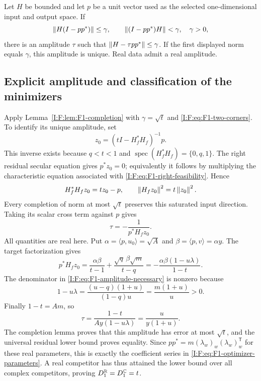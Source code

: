 \begin{lemma}
\label{I:F:lem:F1-completion}
Let $H$ be bounded and let $p$ be a unit vector used as the selected
one-dimensional input and output space. If
\[
 \left\lVert H(I-pp^*)\right\rVert\le\gamma,
 \qquad\left\lVert(I-pp^*)H\right\rVert<\gamma,
 \quad\gamma>0,
\]
there is an amplitude $\tau$ such that
$\left\lVert H-\tau pp^*\right\rVert\le\gamma$. If the first displayed norm equals
$\gamma$, this amplitude is unique. Real data admit a real amplitude.
\end{lemma}



\subsection{Explicit amplitude and classification of the minimizers}

Apply Lemma~\ref{I:F:lem:F1-completion} with $\gamma=\sqrt t$ and
\eqref{I:F:eq:F1-two-corners}. To identify its unique amplitude, set
\[
 z_0=(tI-H_f^*H_f)^{-1}p.
\]
This inverse exists because $q<t<1$ and
$\operatorname{spec}(H_f^*H_f)=\{0,q,1\}$. The right residual secular
equation gives $p^*z_0=0$; equivalently it follows by multiplying the
characteristic equation associated with
\eqref{I:F:eq:F1-right-feasibility}. Hence
\[
 H_f^*H_fz_0=t z_0-p,
 \qquad\left\lVert H_fz_0\right\rVert^2=t\left\lVert z_0\right\rVert^2.
\]
Every completion of norm at most $\sqrt t$ preserves this saturated input
direction. Taking its scalar cross term against $p$ gives
\begin{equation}
 \tau=-\frac1{p^*H_fz_0}.
 \label{I:F:eq:F1-amplitude-necessary}
\end{equation}
All quantities are real here. Put
$\alpha=\langle p,u_0\rangle=\sqrt A$ and
$\beta=\langle p,v\rangle=\alpha y$. The target factorization gives
\[
 p^*H_fz_0
 =\frac{\alpha\beta}{t-1}
  +\frac{\sqrt q\,\beta\sqrt m}{t-q}
 =-\frac{\alpha\beta(1-u\lambda)}{1-t}.
\]
The denominator in \eqref{I:F:eq:F1-amplitude-necessary} is nonzero because
\[
 1-u\lambda=\frac{(u-q)(1+u)}{(1-q)u}
             =\frac{m(1+u)}u>0.
\]
Finally $1-t=Am$, so
\[
 \tau=\frac{1-t}{Ay(1-u\lambda)}
       =\frac{u}{y(1+u)}.
\]
The completion lemma proves that this amplitude has error at most
$\sqrt t$, and the universal residual lower bound proves equality.
Since $pp^*=m(\lambda_w)_w(\lambda_w)_w^{\mathsf T}$ for these real
parameters, this is exactly the coefficient series in
\eqref{I:F:eq:F1-optimizer-parameters}. A real competitor has thus attained
the lower bound over all complex competitors, proving
$D_1^{\mathbb R}=D_1^{\mathbb C}=t$.

